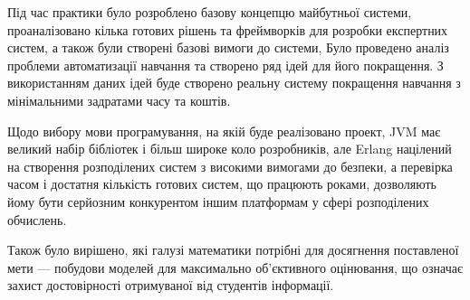 
Під час практики було розроблено базову концепцю майбутньої системи,
проаналізовано кілька готових рішень та фреймворків для розробки експертних
систем, а також були створені базові вимоги до системи,
Було проведено аналіз проблеми автоматизації навчання та створено ряд ідей для
його покращення. 
З використанням даних ідей буде створено реальну систему покращення навчання з
мінімальними задратами часу та коштів.

Щодо вибору мови програмування, на якій буде реалізовано проект, JVM має
великий набір бібліотек і більш широке коло розробників, але Erlang націлений
на створення розподілених систем з високими вимогами до безпеки, а перевірка
часом і достатня кількість готових систем, що працюють роками, дозволяють
йому бути серйозним конкурентом іншим платформам у сфері розподілених
обчислень.

Також було вирішено, які галузі математики потрібні для досягнення поставленої
мети --- побудови моделей для максимально об’єктивного оцінювання, що означає
захист достовірності отримуваної від студентів інформації.
